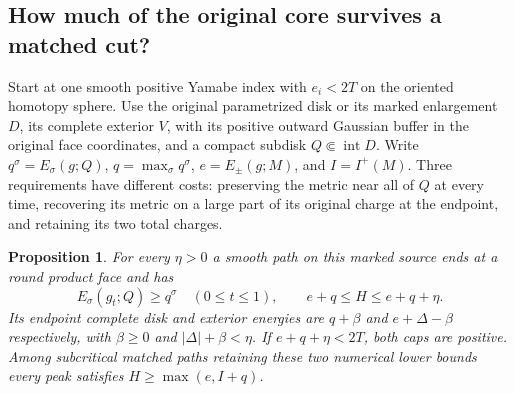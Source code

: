 \documentclass[11pt,letterpaper]{article}
\numberwithin{equation}{section}
\newtheorem{proposition}{Proposition}[section]
\begin{document}
\subsection{How much of the original core survives a matched cut?}
Start at one smooth positive Yamabe index with \(e_i<2T\) on
the oriented homotopy sphere. Use the original parametrized disk or its marked enlargement \(D\), its complete
exterior \(V\), with its positive outward Gaussian buffer in the original face coordinates,
and a compact subdisk \(Q\Subset\operatorname{int}D\).
Write \(q^\sigma=E_\sigma(g;Q)\), \(q=\max_\sigma q^\sigma\),
\(e=E_\pm(g;M)\), and \(I=I^+(M)\).
Three requirements have different costs: preserving the metric near
all of \(Q\) at every time, recovering its metric on a large part of its
original charge at the endpoint, and retaining its two total charges.

\begin{proposition}\label{prop:core-charge-peak}
For every \(\eta>0\) a smooth path on this marked source ends at a
round product face and has
\[
 E_\sigma(g_t;Q)\ge q^\sigma\quad(0\le t\le1),\qquad
 e+q\le H\le e+q+\eta .
\]
Its endpoint complete disk and exterior energies are \(q+\beta\)
and \(e+\Delta-\beta\) respectively, with \(\beta\ge0\) and
\(|\Delta|+\beta<\eta\). If \(e+q+\eta<2T\), both caps are positive.
Among subcritical matched paths retaining these two numerical lower
bounds every peak satisfies \(H\ge\max(e,I+q)\).
\end{proposition}
\end{document}
